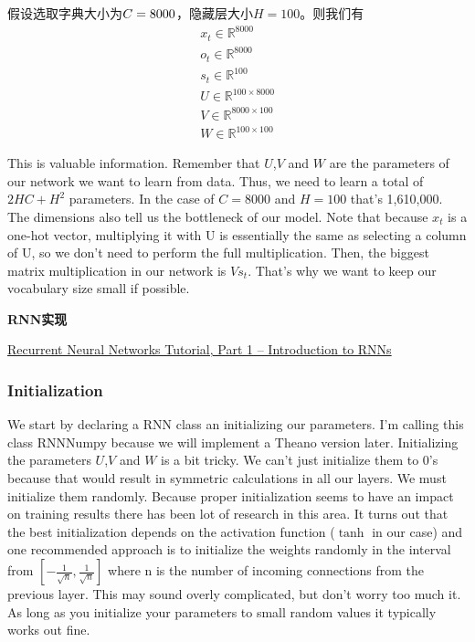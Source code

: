 \documentclass[UTF8,10pt,a4paper]{ctexbook}
\begin{document}
假设选取字典大小为$\mathnormal{C}=8000$，隐藏层大小$H=100$。则我们有
\begin{gather*} 
x_{t} \in \mathbb{R}^{8000} \\
o_{t} \in \mathbb{R}^{8000} \\
s_{t} \in \mathbb{R}^{100} \\
U \in \mathbb{R}^{100 \times 8000} \\
V \in \mathbb{R}^{8000 \times 100} \\
W \in \mathbb{R}^{100 \times 100}
\end{gather*}

This is valuable information. Remember that $U$,$V$ and $W$ are the parameters of our network we want to learn from data. Thus, we need to learn a total of $2HC + H^{2}$ parameters. In the case of $C=8000$ and $H=100$ that's 1,610,000. The dimensions also tell us the bottleneck of our model. Note that because $x_{t}$ is a one-hot vector, multiplying it with U is essentially the same as selecting a column of U, so we don't need to perform the full multiplication. Then, the biggest matrix multiplication in our network is $Vs_{t}$. That's why we want to keep our vocabulary size small if possible.


\textbf{RNN实现}

\href{http://www.wildml.com/2015/09/recurrent-neural-networks-tutorial-part-1-introduction-to-rnns/}{Recurrent Neural Networks Tutorial, Part 1 – Introduction to RNNs}

\subsubsection{Initialization}
We start by declaring a RNN class an initializing our parameters. I'm calling this class RNNNumpy because we will implement a Theano version later. Initializing the parameters $U$,$V$ and $W$ is a bit tricky. We can't just initialize them to 0's because that would result in symmetric calculations in all our layers. We must initialize them randomly. Because proper initialization seems to have an impact on training results there has been lot of research in this area. It turns out that the best initialization depends on the activation function ($\tanh$ in our case) and one recommended approach is to initialize the weights randomly in the interval from $\left[-\frac{1}{\sqrt{n}}, \frac{1}{\sqrt{n}}\right]$ where n is the number of incoming connections from the previous layer. This may sound overly complicated, but don't worry too much it. As long as you initialize your parameters to small random values it typically works out fine.
\end{document}
